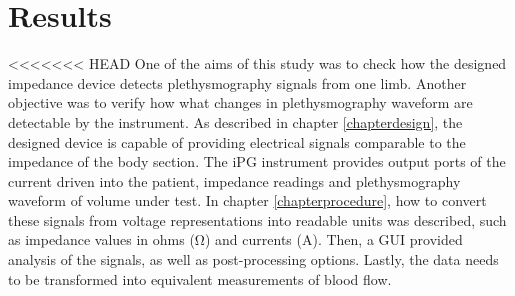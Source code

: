
\chapter{Results}  %
\label{chapter results}

\ifpdf
\graphicspath{{Chapter5/Figs/Raster/}{Chapter5/Figs/PDF/}{Chapter5/Figs/}}
\else
\graphicspath{{Chapter5/Figs/Vector/}{Chapter5/Figs/}}
\fi

<<<<<<< HEAD
One of the aims of this study was to check how the designed impedance device detects plethysmography signals from one limb. Another objective was to verify how what changes in plethysmography waveform are detectable by the instrument. As described in chapter \ref{chapterdesign}, the designed device is capable of providing electrical signals comparable to the impedance of the body section. The iPG instrument provides output ports of the current driven into the patient, impedance readings and plethysmography waveform of volume under test. In chapter \ref{chapterprocedure}, how to convert these signals from voltage representations into readable units was described, such as impedance values in ohms (\si{\ohm}) and currents (\si{\ampere}). Then, a GUI provided analysis of the signals, as well as post-processing options. Lastly, the data needs to be transformed into equivalent measurements of blood flow.

